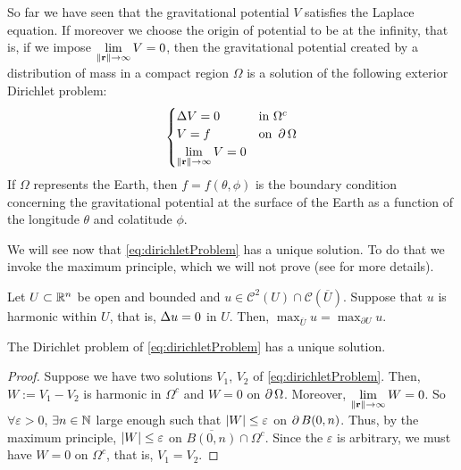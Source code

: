 \documentclass[../main.tex]{subfiles}
\begin{document}
So far we have seen that the gravitational potential $V$ satisfies the Laplace equation. If moreover we choose the origin of potential to be at the infinity, that is, if we impose $\displaystyle\lim_{\left\|\boldsymbol{\mathrm{r}}\right\|\to\infty}V=0$, then the gravitational potential created by a distribution of mass in a compact region $\Omega$ is a solution of the following exterior Dirichlet problem:
\begin{equation}\label{eq:dirichletProblem}
  \begin{cases}
    \Delta V = 0 & \text{in } \Omega^c    \\
    V = f            & \text{on } \operatorname{\partial}{\Omega} \\
    \displaystyle\lim_{\left\|\boldsymbol{\mathrm{r}}\right\|\to\infty}V=0
  \end{cases}
\end{equation}
If $\Omega$ represents the Earth, then $f=f(\theta,\phi)$ is the boundary condition concerning the gravitational potential at the surface of the Earth as a function of the longitude $\theta$ and colatitude $\phi$.

We will see now that \cref{eq:dirichletProblem} has a unique solution. To do that we invoke the maximum principle, which we will not prove (see \cite{evans} for more details).
\begin{theorem}
  Let $U\subset \mathbb{R}^n$ be open and bounded and $u\in\mathcal{C}^2(U)\cap \mathcal{C}(\overline{U})$. Suppose that $u$ is harmonic within $U$, that is, $\Delta u=0$ in $U$. Then, $\max_{\overline{U}}u=\max_{\partial U}u$.
\end{theorem}
\begin{corollary}
  The Dirichlet problem of \cref{eq:dirichletProblem} has a unique solution.
\end{corollary}
\begin{proof}
  Suppose we have two solutions $V_1$, $V_2$ of \cref{eq:dirichletProblem}. Then, $W:=V_1-V_2$ is harmonic in $\Omega^c$ and $W=0$ on $\operatorname{\partial}{\Omega}$. Moreover, $\displaystyle\lim_{\left\|\boldsymbol{\mathrm{r}}\right\|\to\infty}W=0$. So $\forall\varepsilon>0$, $\exists n\in\mathbb{N}$ large enough such that $\abs{W}\leq \varepsilon$ on $\operatorname{\partial}{B(0,n)}$. Thus, by the maximum principle, $\abs{W}\leq \varepsilon$ on $\overline{B(0,n)}\cap \Omega^c$. Since the $\varepsilon$ is arbitrary, we must have $W=0$ on $\Omega^c$, that is, $V_1=V_2$.
\end{proof}
\end{document}

